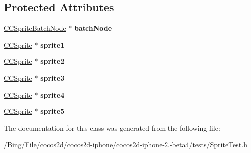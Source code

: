 \subsection*{Protected Attributes}
\begin{DoxyCompactItemize}
\item 
\hypertarget{interface_sprite_batch_node_reorder_same_index_a0684c3a2aee73d028d8fc8aab4374791}{\hyperlink{interface_c_c_sprite_batch_node}{C\-C\-Sprite\-Batch\-Node} $\ast$ {\bfseries batch\-Node}}\label{interface_sprite_batch_node_reorder_same_index_a0684c3a2aee73d028d8fc8aab4374791}

\item 
\hypertarget{interface_sprite_batch_node_reorder_same_index_aa777906090909996dee1557763ba468d}{\hyperlink{class_c_c_sprite}{C\-C\-Sprite} $\ast$ {\bfseries sprite1}}\label{interface_sprite_batch_node_reorder_same_index_aa777906090909996dee1557763ba468d}

\item 
\hypertarget{interface_sprite_batch_node_reorder_same_index_a7cf26af885a747f66798c4985d5c398e}{\hyperlink{class_c_c_sprite}{C\-C\-Sprite} $\ast$ {\bfseries sprite2}}\label{interface_sprite_batch_node_reorder_same_index_a7cf26af885a747f66798c4985d5c398e}

\item 
\hypertarget{interface_sprite_batch_node_reorder_same_index_a257c9baa836a88277428dcbe521ffe8c}{\hyperlink{class_c_c_sprite}{C\-C\-Sprite} $\ast$ {\bfseries sprite3}}\label{interface_sprite_batch_node_reorder_same_index_a257c9baa836a88277428dcbe521ffe8c}

\item 
\hypertarget{interface_sprite_batch_node_reorder_same_index_a503054092aa172f0263c82083afcd27e}{\hyperlink{class_c_c_sprite}{C\-C\-Sprite} $\ast$ {\bfseries sprite4}}\label{interface_sprite_batch_node_reorder_same_index_a503054092aa172f0263c82083afcd27e}

\item 
\hypertarget{interface_sprite_batch_node_reorder_same_index_aa89a4c922ad12a68b80156b5ee19a7da}{\hyperlink{class_c_c_sprite}{C\-C\-Sprite} $\ast$ {\bfseries sprite5}}\label{interface_sprite_batch_node_reorder_same_index_aa89a4c922ad12a68b80156b5ee19a7da}

\end{DoxyCompactItemize}


The documentation for this class was generated from the following file\-:\begin{DoxyCompactItemize}
\item 
/\-Bing/\-File/cocos2d/cocos2d-\/iphone/cocos2d-\/iphone-\/2.-\/beta4/tests/Sprite\-Test.\-h\end{DoxyCompactItemize}

